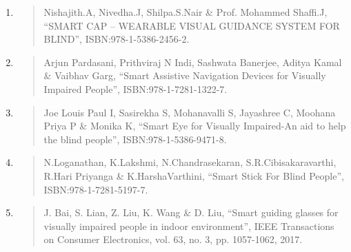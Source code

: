 \documentclass{article}
\begin{document}
\begin{enumerate}
\def\labelenumi{\arabic{enumi}.}
\item
  \begin{quote}
  Nishajith.A, Nivedha.J, Shilpa.S.Nair \& Prof. Mohammed Shaffi.J,
  ``SMART CAP -- WEARABLE VISUAL GUIDANCE SYSTEM FOR BLIND'',
  ISBN:978-1-5386-2456-2.
  \end{quote}
\item
  \begin{quote}
  Arjun Pardasani, Prithviraj N Indi, Sashwata Banerjee, Aditya Kamal \&
  Vaibhav Garg, ``Smart Assistive Navigation Devices for Visually
  Impaired People'', ISBN:978-1-7281-1322-7.
  \end{quote}
\item
  \begin{quote}
  Joe Louis Paul I, Sasirekha S, Mohanavalli S, Jayashree C, Moohana
  Priya P \& Monika K, ``Smart Eye for Visually Impaired-An aid to help
  the blind people'', ISBN:978-1-5386-9471-8.
  \end{quote}
\item
  \begin{quote}
  N.Loganathan, K.Lakshmi, N.Chandrasekaran, S.R.Cibisakaravarthi,
  R.Hari Priyanga \& K.HarshaVarthini, ``Smart Stick For Blind People'',
  ISBN:978-1-7281-5197-7.
  \end{quote}
\item
  \begin{quote}
  J. Bai, S. Lian, Z. Liu, K. Wang \& D. Liu, ``Smart guiding glasses
  for visually impaired people in indoor environment'', IEEE
  Transactions on Consumer Electronics, vol. 63, no. 3, pp. 1057-1062,
  2017.
  \end{quote}
\end{enumerate}
\end{document}
